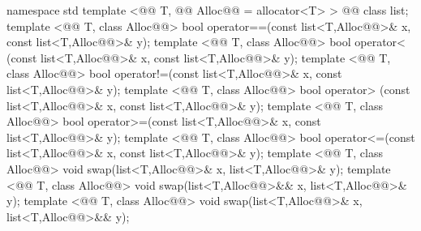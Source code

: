 \documentclass[american,twoside]{book}
\begin{document}
\begin{codeblock}
namespace std {
  template <@@ T, @@ Alloc@@ = allocator<T> > 
    @@
    class list;
  template <@@ T, class Alloc@@>
    bool operator==(const list<T,Alloc@@>& x, const list<T,Alloc@@>& y);
  template <@@ T, class Alloc@@>
    bool operator< (const list<T,Alloc@@>& x, const list<T,Alloc@@>& y);
  template <@@ T, class Alloc@@>
    bool operator!=(const list<T,Alloc@@>& x, const list<T,Alloc@@>& y);
  template <@@ T, class Alloc@@>
    bool operator> (const list<T,Alloc@@>& x, const list<T,Alloc@@>& y);
  template <@@ T, class Alloc@@>
    bool operator>=(const list<T,Alloc@@>& x, const list<T,Alloc@@>& y);
  template <@@ T, class Alloc@@>
    bool operator<=(const list<T,Alloc@@>& x, const list<T,Alloc@@>& y);
  template <@@ T, class Alloc@@>
    void swap(list<T,Alloc@@>& x, list<T,Alloc@@>& y);
  template <@@ T, class Alloc@@>
    void swap(list<T,Alloc@@>&& x, list<T,Alloc@@>& y);
  template <@@ T, class Alloc@@>
    void swap(list<T,Alloc@@>& x, list<T,Alloc@@>&& y);
}
\end{codeblock}

%
\end{document}
